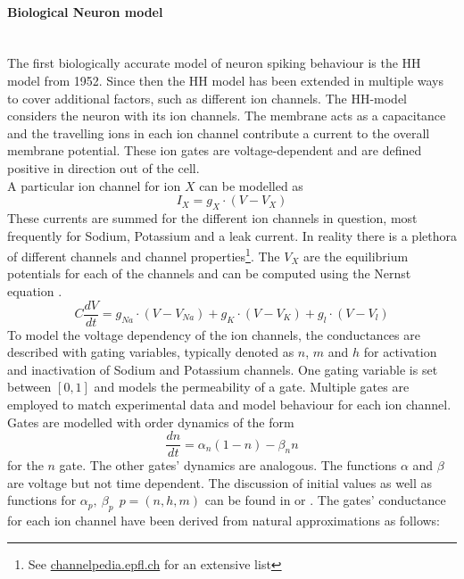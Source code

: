 \paragraph{Biological Neuron model}\mbox{}\\
The first biologically accurate model of neuron spiking behaviour is the \ac{HH} model from 1952\cite{hodgkin_currents_1952}. Since then the \ac{HH} model has been extended in multiple ways to cover additional factors, such as different ion channels. The \ac{HH}-model considers the neuron with its ion channels. The membrane acts as a capacitance and the travelling ions in each ion channel contribute a current to the overall membrane potential. These ion gates are voltage-dependent and are defined positive in direction out of the cell.\\
A particular ion channel for ion $X$ can be modelled as
\begin{equation}
I_X= g_X \cdot (V-V_X)
\end{equation}
These currents are summed for the different ion channels in question, most frequently for Sodium, Potassium and a leak current. In reality there is a plethora of different channels and channel properties\footnote{See \url{channelpedia.epfl.ch} for an extensive list}. The $V_X$ are the equilibrium potentials for each of the channels and can be computed using the Nernst equation \cite{johnston_foundations_1995}.
\begin{equation}
C \frac{dV}{dt} = g_{Na} \cdot (V-V_{Na}) + g_K \cdot (V-V_K) + g_l \cdot (V-V_l)
\end{equation}
To model the voltage dependency of the ion channels, the conductances are described with gating variables, typically denoted as $n$, $m$ and $h$ for activation and inactivation of Sodium and Potassium channels. One gating variable is set between $[0,1]$ and models the permeability of a gate. Multiple gates are employed to match experimental data and model behaviour for each ion channel.\\
Gates are modelled with order dynamics of the form
\begin{equation}
\frac{dn}{dt} = \alpha_n(1-n) - \beta_n n
\end{equation}
for the $n$ gate. The other gates' dynamics are analogous. The functions $\alpha$ and $\beta$ are voltage but not time dependent. The discussion of initial values as well as functions for $\alpha_p,\ \beta_p\ \ p = (n,h,m)$ can be found in \cite{hodgkin_quantitative_1952} or \cite{johnston_foundations_1995}. The gates' conductance for each ion channel have been derived from natural approximations as follows:
